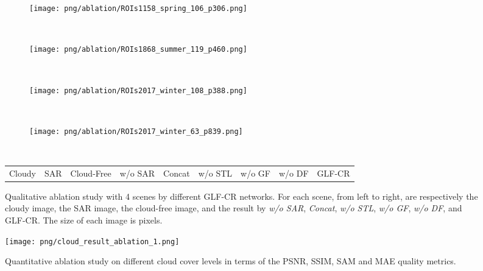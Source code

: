 \documentclass[a4paper,fleqn]{cas-dc}
\begin{document}
 
\def\sswidth{0.98\textwidth}
\begin{figure*}[!h]
    \centering
    \begin{subfigure}[b]{\sswidth}
     \centering
     \texttt{[image: png/ablation/ROIs1158\_spring\_106\_p306.png]}
    \end{subfigure}
    \\
    \begin{subfigure}[b]{\sswidth}
     \centering
     \texttt{[image: png/ablation/ROIs1868\_summer\_119\_p460.png]}
    \end{subfigure}
    \\
    \begin{subfigure}[b]{\sswidth}
     \centering
     \texttt{[image: png/ablation/ROIs2017\_winter\_108\_p388.png]}
    \end{subfigure}
    \\
    \begin{subfigure}[b]{\sswidth}
     \centering
     \texttt{[image: png/ablation/ROIs2017\_winter\_63\_p839.png]}
    \end{subfigure}
    \\
    \begin{minipage}{\sswidth}
    \begin{tabu} to \textwidth {X[c] X[c] X[c] X[c] X[c] X[c] X[c] X[c] X[c]}
    Cloudy & SAR & Cloud-Free & w/o SAR & Concat & w/o STL & w/o GF & w/o DF & GLF-CR
    \end{tabu}
    \end{minipage}
    \caption{Qualitative ablation study with 4 scenes by different GLF-CR networks. For each scene, from left to right, are respectively the cloudy image, the SAR image, the cloud-free image, and the result by {\it w/o SAR}, {\it Concat}, {\it w/o STL}, {\it w/o GF}, {\it w/o DF}, and GLF-CR. The size of each image is  pixels.}
    \label{ablation-study-figure}
    \vspace{-5mm}
\end{figure*}

\begin{figure*}[!t]
     \centering
     \texttt{[image: png/cloud\_result\_ablation\_1.png]}
     \vspace{-3mm}
     \caption{Quantitative ablation study on different cloud cover levels in terms of the PSNR, SSIM, SAM and MAE quality metrics.}
     \label{fig:ablation_cloud}
     \vspace{-5mm}
\end{figure*}
 
\end{document}
